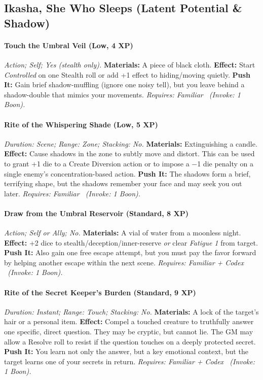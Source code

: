 \documentclass[12pt,twoside]{book}
\begin{document}
\subsection{Ikasha, She Who Sleeps (Latent Potential \& Shadow)}
\paragraph{Touch the Umbral Veil (Low, 4 XP)} \emph{Action; Self; Yes (stealth only).}
\textbf{Materials:} A piece of black cloth.
\textbf{Effect:} Start \emph{Controlled} on one Stealth roll or add +1 effect to hiding/moving quietly.
\textbf{Push It:} Gain brief shadow-muffling (ignore one noisy tell), but you leave behind a shadow-double that mimics your movements.
\emph{Requires: Familiar \ (\textit{Invoke:} 1 Boon).}
\paragraph{Rite of the Whispering Shade (Low, 5 XP)} \emph{Duration: Scene; Range: Zone; Stacking: No.}
\textbf{Materials:} Extinguishing a candle.
\textbf{Effect:} Cause shadows in the zone to subtly move and distort. This can be used to grant +1 die to a Create Diversion action or to impose a −1 die penalty on a single enemy's concentration-based action.
\textbf{Push It:} The shadows form a brief, terrifying shape, but the shadows remember your face and may seek you out later.
\emph{Requires: Familiar \ (\textit{Invoke:} 1 Boon).}
\paragraph{Draw from the Umbral Reservoir (Standard, 8 XP)} \emph{Action; Self or Ally; No.}
\textbf{Materials:} A vial of water from a moonless night.
\textbf{Effect:} +2 dice to stealth/deception/inner-reserve \emph{or} clear \emph{Fatigue 1} from target.
\textbf{Push It:} Also gain one free escape attempt, but you must pay the favor forward by helping another escape within the next scene.
\emph{Requires: Familiar + Codex \ (\textit{Invoke:} 1 Boon).}
\paragraph{Rite of the Secret Keeper's Burden (Standard, 9 XP)} \emph{Duration: Instant; Range: Touch; Stacking: No.}
\textbf{Materials:} A lock of the target's hair or a personal item.
\textbf{Effect:} Compel a touched creature to truthfully answer one specific, direct question. They may be cryptic, but cannot lie. The GM may allow a Resolve roll to resist if the question touches on a deeply protected secret.
\textbf{Push It:} You learn not only the answer, but a key emotional context, but the target learns one of your secrets in return.
\emph{Requires: Familiar + Codex \ (\textit{Invoke:} 1 Boon).}
\end{document}
